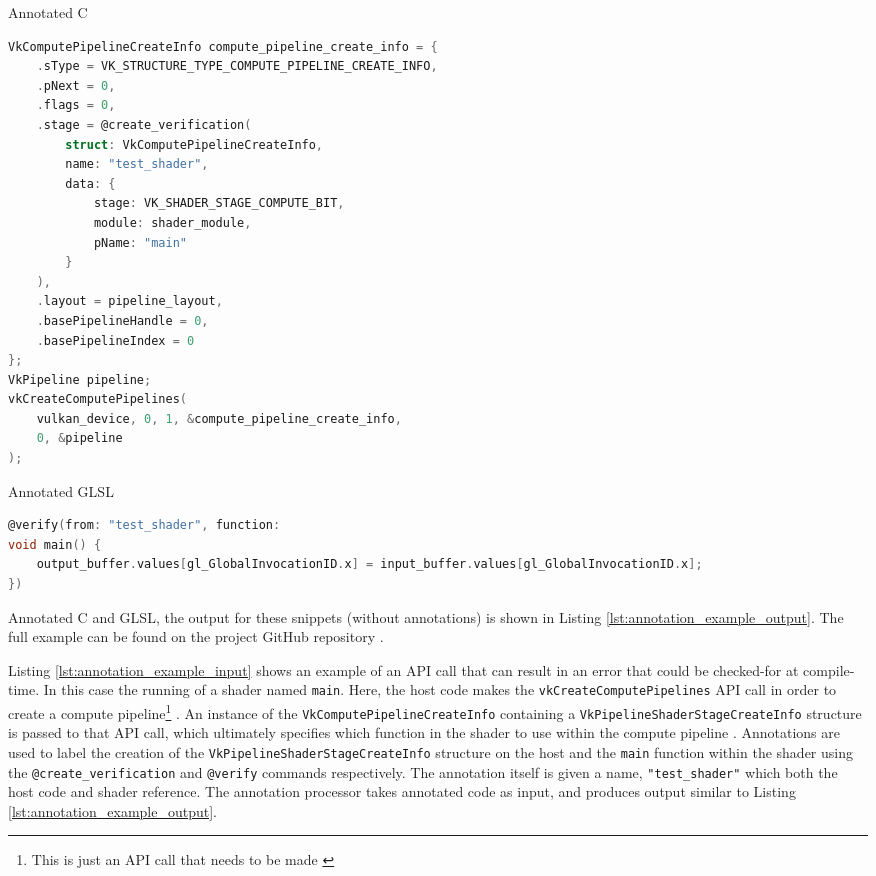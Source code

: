 \documentclass[a4paper,12pt,twoside,openright]{report}
\begin{document}
\begin{lstfloat}
\begin{center} Annotated C \end{center}
\begin{lstlisting}[language=C]
VkComputePipelineCreateInfo compute_pipeline_create_info = {
    .sType = VK_STRUCTURE_TYPE_COMPUTE_PIPELINE_CREATE_INFO,
    .pNext = 0,
    .flags = 0,
    .stage = @create_verification(
        struct: VkComputePipelineCreateInfo,
        name: "test_shader",
        data: {
            stage: VK_SHADER_STAGE_COMPUTE_BIT,
            module: shader_module,
            pName: "main"
        }
    ),
    .layout = pipeline_layout,
    .basePipelineHandle = 0,
    .basePipelineIndex = 0
};
VkPipeline pipeline;
vkCreateComputePipelines(
    vulkan_device, 0, 1, &compute_pipeline_create_info,
    0, &pipeline
);
\end{lstlisting}
\begin{center} Annotated GLSL \end{center}
\begin{lstlisting}[language=C]
@verify(from: "test_shader", function:
void main() {
    output_buffer.values[gl_GlobalInvocationID.x] = input_buffer.values[gl_GlobalInvocationID.x];
})
\end{lstlisting}
\caption{Annotated C and GLSL, the output for these snippets (without
annotations) is shown in Listing \ref{lst:annotation_example_output}. The full
example can be found on the project GitHub repository \cite{ProjectSource}.}
\label{lst:annotation_example_input}
\end{lstfloat}

Listing \ref{lst:annotation_example_input} shows an example of an API call that
can result in an error that could be checked-for at compile-time. In this case
the running of a shader named \texttt{main}. Here, the host code makes the
\texttt{vkCreateComputePipelines} API call in order to create a compute
pipeline\footnote{This is just an API call that needs to be made \cite{TODO}}
\cite{vkCreateComputePipelines}. An instance of the
\texttt{VkComputePipelineCreateInfo} containing a
\texttt{VkPipelineShaderStageCreateInfo} structure is passed to that API call,
which ultimately specifies which function in the shader to use within the
compute pipeline \cite{VkComputePipelineCreateInfo}
\cite{VkPipelineShaderStageCreateInfo}. Annotations are used to label the
creation of the \texttt{VkPipelineShaderStageCreateInfo} structure on the host
and the \texttt{main} function within the shader using the
\texttt{@create\_verification} and \texttt{@verify} commands respectively. The
annotation itself is given a name, \texttt{"test\_shader"} which both the host
code and shader reference. The annotation processor takes annotated code as
input, and produces output similar to Listing
\ref{lst:annotation_example_output}.
\end{document}
